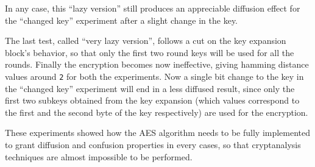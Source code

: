 \documentclass[12pt]{article}
\begin{document}
\begin{table}[h!]
    \centering
    \caption{Two results (in blocks) of the "changed plaintext" experiment ("lazy version")}
\end{table}

In any case, this ``lazy version'' still produces an appreciable diffusion effect for the ``changed key'' experiment after a slight change in the key.

The last test, called ``very lazy version'', follows a cut on the key expansion block's behavior, so that only the first two round keys will be used for all the rounds. Finally the encryption becomes now ineffective, giving hamming distance values around \verb|2| for both the experiments. Now a single bit change to the key in the ``changed key'' experiment will end in a less diffused result, since only the first two subkeys obtained from the key expansion (which values correspond to the first and the second byte of the key respectively) are used for the encryption.

These experiments showed how the AES algorithm needs to be fully implemented to grant diffusion and confusion properties in every cases, so that cryptanalysis techniques are almost impossible to be performed.

\begin{table}[h!]
    \centering
    \caption{Average hamming distance between ciphetexts}
\end{table}
\end{document}
